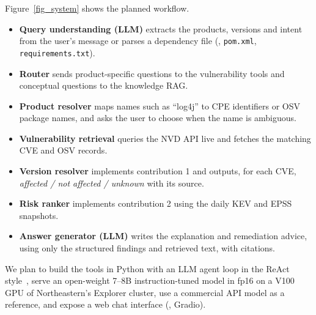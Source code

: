 \documentclass[final]{cvpr}
\begin{document}
Figure~\ref{fig_system} shows the planned workflow.
\begin{itemize}
  \item \textbf{Query understanding (LLM)} extracts the products, versions and intent from the user's message or parses a dependency file (\eg, \texttt{pom.xml}, \texttt{requirements.txt}).
  \item \textbf{Router} sends product-specific questions to the vulnerability tools and conceptual questions to the knowledge RAG.
  \item \textbf{Product resolver} maps names such as ``log4j'' to CPE identifiers or OSV package names, and asks the user to choose when the name is ambiguous.
  \item \textbf{Vulnerability retrieval} queries the NVD API live and fetches the matching CVE and OSV records.
  \item \textbf{Version resolver} implements contribution 1 and outputs, for each CVE, \emph{affected / not affected / unknown} with its source.
  \item \textbf{Risk ranker} implements contribution 2 using the daily KEV and EPSS snapshots.
  \item \textbf{Answer generator (LLM)} writes the explanation and remediation advice, using only the structured findings and retrieved text, with citations.
\end{itemize}
We plan to build the tools in Python with an LLM agent loop in the ReAct style~\cite{yao2023react}, serve an open-weight 7--8B instruction-tuned model in fp16 on a V100 GPU of Northeastern's Explorer cluster, use a commercial API model as a reference, and expose a web chat interface (\eg, Gradio).


{\small


}
\end{document}
